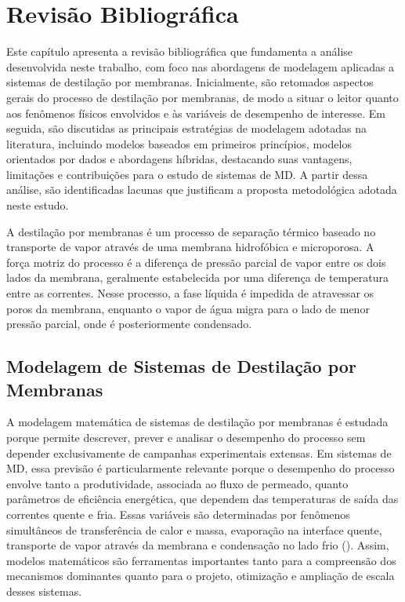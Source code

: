 \chapter{Revisão Bibliográfica}
\label{chap3}

Este capítulo apresenta a revisão bibliográfica que fundamenta a análise desenvolvida neste trabalho, com foco nas abordagens de modelagem aplicadas a sistemas de destilação por membranas. Inicialmente, são retomados aspectos gerais do processo de destilação por membranas, de modo a situar o leitor quanto aos fenômenos físicos envolvidos e às variáveis de desempenho de interesse. Em seguida, são discutidas as principais estratégias de modelagem adotadas na literatura, incluindo modelos baseados em primeiros princípios, modelos orientados por dados e abordagens híbridas, destacando suas vantagens, limitações e contribuições para o estudo de sistemas de MD. A partir dessa análise, são identificadas lacunas que justificam a proposta metodológica adotada neste estudo.

A destilação por membranas é um processo de separação térmico baseado no transporte de vapor através de uma membrana hidrofóbica e microporosa. A força motriz do processo é a diferença de pressão parcial de vapor entre os dois lados da membrana, geralmente estabelecida por uma diferença de temperatura entre as correntes. Nesse processo, a fase líquida é impedida de atravessar os poros da membrana, enquanto o vapor de água migra para o lado de menor pressão parcial, onde é posteriormente condensado.

\section{Modelagem de Sistemas de Destilação por Membranas}
\label{sec:modelagem_md}

A modelagem matemática de sistemas de destilação por membranas é estudada porque permite descrever, prever e analisar o desempenho do processo sem depender exclusivamente de campanhas experimentais extensas. Em sistemas de MD, essa previsão é particularmente relevante porque o desempenho do processo envolve tanto a produtividade, associada ao fluxo de permeado, quanto parâmetros de eficiência energética, que dependem das temperaturas de saída das correntes quente e fria. Essas variáveis são determinadas por fenômenos simultâneos de transferência de calor e massa, evaporação na interface quente, transporte de vapor através da membrana e condensação no lado frio (\cite{ExperimentalMD, S2MD}). Assim, modelos matemáticos são ferramentas importantes tanto para a compreensão dos mecanismos dominantes quanto para o projeto, otimização e ampliação de escala desses sistemas.

